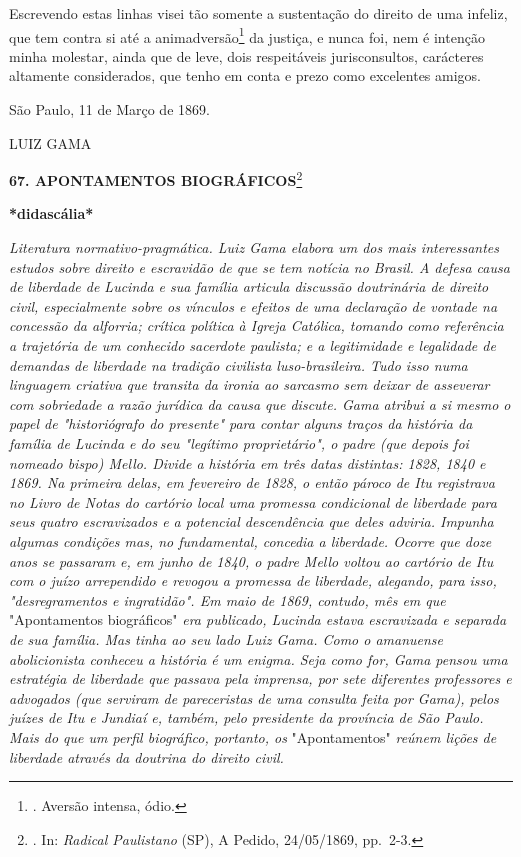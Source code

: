 Escrevendo estas linhas visei tão somente a sustentação do direito de
uma infeliz, que tem contra si até a animadversão\footnote{. Aversão
  intensa, ódio.} da justiça, e nunca foi, nem é intenção minha
molestar, ainda que de leve, dois respeitáveis jurisconsultos,
carácteres altamente considerados, que tenho em conta e prezo como
excelentes amigos.

São Paulo, 11 de Março de 1869.

LUIZ GAMA

\textbf{67. APONTAMENTOS BIOGRÁFICOS}\footnote{. In: \emph{Radical
  Paulistano} (SP), A Pedido, 24/05/1869, pp.~2-3.}

\textbf{*didascália*}

\emph{Literatura normativo-pragmática. Luiz Gama elabora um dos mais
interessantes estudos sobre direito e escravidão de que se tem notícia
no Brasil. A defesa causa de liberdade de Lucinda e sua família articula
discussão doutrinária de direito civil, especialmente sobre os vínculos
e efeitos de uma declaração de vontade na concessão da alforria; crítica
política à Igreja Católica, tomando como referência a trajetória de um
conhecido sacerdote paulista; e a legitimidade e legalidade de demandas
de liberdade na tradição civilista luso-brasileira. Tudo isso numa
linguagem criativa que transita da ironia ao sarcasmo sem deixar de
asseverar com sobriedade a razão jurídica da causa que discute. Gama
atribui a si mesmo o papel de "historiógrafo do presente" para contar
alguns traços da história da família de Lucinda e do seu "legítimo
proprietário", o padre (que depois foi nomeado bispo) Mello. Divide a
história em três datas distintas: 1828, 1840 e 1869. Na primeira delas,
em fevereiro de 1828, o então pároco de Itu registrava no Livro de Notas
do cartório local uma promessa condicional de liberdade para seus quatro
escravizados e a potencial descendência que deles adviria. Impunha
algumas condições mas, no fundamental, concedia a liberdade. Ocorre que
doze anos se passaram e, em junho de 1840, o padre Mello voltou ao
cartório de Itu com o juízo arrependido e revogou a promessa de
liberdade, alegando, para isso, "desregramentos e ingratidão". Em maio
de 1869, contudo, mês em que} "Apontamentos biográficos" \emph{era
publicado, Lucinda estava escravizada e separada de sua família. Mas
tinha ao seu lado Luiz Gama. Como o amanuense abolicionista conheceu a
história é um enigma. Seja como for, Gama pensou uma estratégia de
liberdade que passava pela imprensa, por sete diferentes professores e
advogados (que serviram de pareceristas de uma consulta feita por Gama),
pelos juízes de Itu e Jundiaí e, também, pelo presidente da província de
São Paulo. Mais do que um perfil biográfico, portanto, os}
"Apontamentos" \emph{reúnem lições de liberdade através da doutrina do
direito civil.}

